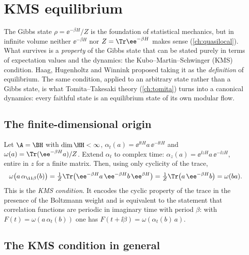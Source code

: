 \chapter{KMS equilibrium}\label{ch:kms}

\begin{physmotiv}
The Gibbs state $\rho=\ee^{-\beta H}/Z$ is the foundation of statistical mechanics, but in infinite volume neither $\ee^{-\beta H}$ nor $Z=\Tr\ee^{-\beta H}$ makes sense (\cref{ch:quasilocal}). What survives is a \emph{property} of the Gibbs state that can be stated purely in terms of expectation values and the dynamics: the Kubo--Martin--Schwinger (KMS) condition. Haag, Hugenholtz and Winnink proposed taking it as the \emph{definition} of equilibrium. The same condition, applied to an arbitrary state rather than a Gibbs state, is what Tomita--Takesaki theory (\cref{ch:tomita}) turns into a canonical dynamics: every faithful state is an equilibrium state of its own modular flow.
\end{physmotiv}

\section{The finite-dimensional origin}

Let $\A=\BH$ with $\dim\HH<\infty$, $\alpha_t(a)=\ee^{\ii tH}a\,\ee^{-\ii tH}$ and $\omega(a)=\Tr(\ee^{-\beta H}a)/Z$. Extend $\alpha_t$ to complex time: $\alpha_{z}(a)=\ee^{\ii zH}a\,\ee^{-\ii zH}$, entire in $z$ for a finite matrix. Then, using only cyclicity of the trace,
\begin{equation}
\omega\big(a\,\alpha_{\ii\beta}(b)\big)=\tfrac1Z\Tr\big(\ee^{-\beta H}a\,\ee^{-\beta H}b\,\ee^{\beta H}\big)=\tfrac1Z\Tr\big(a\,\ee^{-\beta H}b\big)=\omega(ba).\label{eq:kmsfinite}
\end{equation}
This is the \emph{KMS condition}. It encodes the cyclic property of the trace in the presence of the Boltzmann weight and is equivalent to the statement that correlation functions are periodic in imaginary time with period $\beta$: with $F(t)=\omega(a\,\alpha_t(b))$ one has $F(t+\ii\beta)=\omega(\alpha_t(b)\,a)$.

\section{The KMS condition in general}


